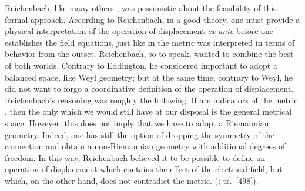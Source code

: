 \documentclass[submitted]{article}
\renewcommand{\rzlap}[2]{(\cite[#1]{Reichenbach1928}; tr.\ [#2])\xspace}
\begin{document}

%


Reichenbach, like many others , was pessimistic about the feasibility of this formal approach. According to Reichenbach, in a good theory, one must provide a physical interpretation of the operation of displacement \emph{ex ante} before one establishes the field equations, just like in \gr the metric was interpreted in terms of \rac behavior from the outset. Reichenbach, so to speak, wanted to combine the best of both worlds. Contrary to Eddington, he considered important to adopt a balanced space, like Weyl geometry; but at the same time, contrary to Weyl, he did not want to forgo a coordinative definition of the operation of displacement. Reichenbach's reasoning was roughly the following. If \rac are indicators of the metric \gmn, then the only  which we would still have at our disposal is the general metrical space. However, this does not imply that we have to adopt a Riemannian geometry. Indeed, one has still the option of dropping the symmetry of the connection \asym and obtain a non-Riemannian geometry with additional degrees of freedom. In this way, Reichenbach believed it to be possible to define an operation of displacement which contains the effect of the electrical field, but which, on the other hand, does not contradict the metric.  \rzlap{357}{498}. 
\end{document}

